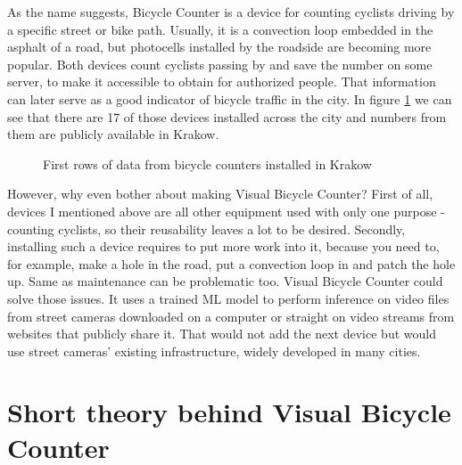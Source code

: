 As the name suggests, Bicycle Counter is a device for counting cyclists driving by a specific street or bike path. Usually, it is a convection loop embedded in the asphalt of a road, but photocells installed by the roadside are becoming more popular. Both devices count cyclists passing by and save the number on some server, to make it accessible to obtain for authorized people. That information can later serve as a good indicator of bicycle traffic in the city. In figure \ref{fig:countersKrakow} we can see that there are 17 of those devices installed across the city and numbers from them are publicly available in Krakow.
\begin{figure}[H]
    \centering
    \caption{First rows of data from bicycle counters installed in Krakow \cite{mobilnykrakow}}
    \label{fig:countersKrakow}
\end{figure}
However, why even bother about making Visual Bicycle Counter? First of all, devices I mentioned above are all other equipment used with only one purpose - counting cyclists, so their reusability leaves a lot to be desired. Secondly, installing such a device requires to put more work into it, because you need to, for example, make a hole in the road, put a convection loop in and patch the hole up. Same as maintenance can be problematic too. Visual Bicycle Counter could solve those issues. It uses a trained ML model to perform inference on video files from street cameras downloaded on a computer or straight on video streams from websites that publicly share it. That would not add the next device but would use street cameras' existing infrastructure, widely developed in many cities.



\section{Short theory behind Visual Bicycle Counter}
\label{sec:theory}

